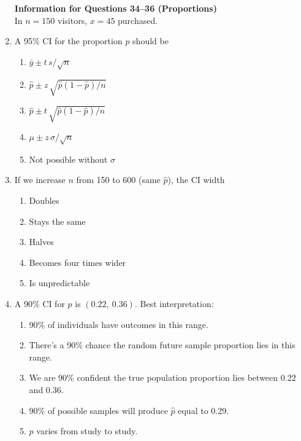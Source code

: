\documentclass{article}
\begin{document}
\begin{enumerate}
\textbf{Information for Questions 34--36 (Proportions)}\\
In $n=150$ visitors, $x=45$ purchased.
\item A 95\% CI for the proportion $p$ should be
    \begin{enumerate}[label=\Alph*.]
        \item $\bar y \pm t\,s/\sqrt n$
        \item $\hat p \pm z\,\sqrt{\hat p(1-\hat p)/n}$
        \item $\hat p \pm t\,\sqrt{\hat p(1-\hat p)/n}$
        \item $\mu \pm z\,\sigma/\sqrt n$
        \item Not possible without $\sigma$
    \end{enumerate}
\item If we increase $n$ from 150 to 600 (same $\hat p$), the CI width
    \begin{enumerate}[label=\Alph*.]
        \item Doubles
        \item Stays the same
        \item Halves
        \item Becomes four times wider
        \item Is unpredictable
    \end{enumerate}
\item A 90\% CI for $p$ is $(0.22,\ 0.36)$. Best interpretation:
    \begin{enumerate}[label=\Alph*.]
        \item 90\% of individuals have outcomes in this range.
        \item There’s a 90\% chance the random future sample proportion lies in this range.
        \item We are 90\% confident the true population proportion lies between 0.22 and 0.36.
        \item 90\% of possible samples will produce $\hat p$ equal to 0.29.
        \item $p$ varies from study to study.
    \end{enumerate}


\end{enumerate}
\end{document}
